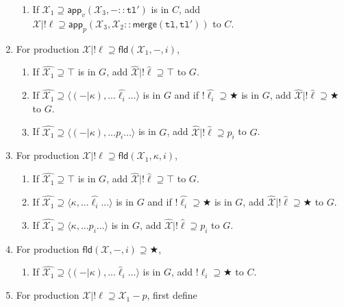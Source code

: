 \documentclass[a4paper]{article}
\newcommand*\vbar{|}
\begin{document}
\begin{enumerate}
\begin{enumerate}
        \item If $\mathcal{X_1}\supseteq\mathsf{app}_v(\mathcal{X}_3,-::\mathtt{tl}')$ is in $C$, add $\mathcal{X}\vbar!\ell\supseteq\mathsf{app}_p(\mathcal{X}_3,\mathcal{X_2}::\mathsf{merge}(\mathtt{tl},\mathtt{tl}'))$ to $C$.
    \end{enumerate}
    \item For production $\mathcal{X}\vbar!\ell\supseteq\mathsf{fld}(\mathcal{X}_1,-,i)$,
    \begin{enumerate}
        \item If $\hat{\mathcal{X}_1}\supseteq\top$ is in $G$, add $\hat{\mathcal{X}}\vbar!\hat{\ell}\supseteq\top$ to $G$.
        \item If $\hat{\mathcal{X}_1}\supseteq\langle(-\vbar\kappa),...\hat{\ell_i}...\rangle$ is in $G$ and if $!\hat{\ell_i}\supseteq\bigstar$ is in $G$, add $\hat{\mathcal{X}}\vbar!\hat{\ell}\supseteq\bigstar$ to $G$.
        \item If $\hat{\mathcal{X}_1}\supseteq\langle(-\vbar\kappa),...p_i...\rangle$ is in $G$, add $\hat{\mathcal{X}}\vbar!\hat{\ell}\supseteq p_i$ to $G$.
    \end{enumerate}    
    \item For production $\mathcal{X}\vbar!\ell\supseteq\mathsf{fld}(\mathcal{X}_1,\kappa,i)$,
    \begin{enumerate}
        \item If $\hat{\mathcal{X}_1}\supseteq\top$ is in $G$, add $\hat{\mathcal{X}}\vbar!\hat{\ell}\supseteq\top$ to $G$.
        \item If $\hat{\mathcal{X}_1}\supseteq\langle\kappa,...\hat{\ell_i}...\rangle$ is in $G$ and if $!\hat{\ell_i}\supseteq\bigstar$ is in $G$, add $\hat{\mathcal{X}}\vbar!\hat{\ell}\supseteq\bigstar$ to $G$.
        \item If $\hat{\mathcal{X}_1}\supseteq\langle\kappa,...p_i...\rangle$ is in $G$, add $\hat{\mathcal{X}}\vbar!\hat{\ell}\supseteq p_i$ to $G$.
    \end{enumerate}
    \item For production $\mathsf{fld}(\mathcal{X}, -, i)\supseteq\bigstar$,
    \begin{enumerate}
        \item If $\hat{\mathcal{X}_1}\supseteq\langle(-\vbar\kappa),...\hat\ell_i...\rangle$ is in $G$, add $!\ell_i\supseteq\bigstar$ to $C$.
    \end{enumerate}
    \item For production $\mathcal{X}\vbar!\ell\supseteq\mathcal{X}_1-p$, first define

\end{enumerate}
\end{document}
